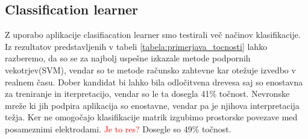 \subsection{Classification learner}
Z uporabo aplikacije clasifiacation learner smo testirali več načinov klasifikacije. Iz rezultatov predstavljenih v tabeli \ref{tabela:primerjava_tocnosti} lahko razberemo, da so se za najbolj uspešne izkazale metode podpornih vekotrjev(SVM), vendar so te metode računsko zahtevne kar otežuje izvedbo v realnem času. Dober kandidat bi lahko bila odločitvena drevesa saj so enostavna za treniranje in iterpretacijo, vendar so le ta dosegla 41\% točnost. Nevronske mreže ki jih podpira aplikacija so enostavne, vendar pa je njihova interpretacija težja. Ker ne omogočajo klasifikacije matrik izgubimo prostorske povezave med posameznimi elektrodami. \textcolor{red}{Je to res?} Dosegle so 49\% točnost.
